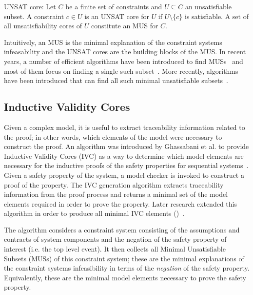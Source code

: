 \begin{definition} UNSAT core: Let $C$ be a finite set of constraints and $U \subseteq C$ an unsatisfiable subset. A constraint $c \in U$ is an UNSAT core for $U$ if $U \setminus \{c\}$ is satisfiable. A set of all unsatisfiability cores of $U$ constitute an MUS for $C$. 
\end{definition}

Intuitively, an MUS is the minimal explanation of the constraint systems infeasability and the UNSAT cores are the building blocks of the MUS. In recent years, a number of efficient algorithms have been introduced to find MUSs~\cite{liffiton2005max} and most of them focus on finding a single such subset~\cite{belov2012towards, belov2013core, belov2012muser2}. More recently, algorithms have been introduced that can find all such minimal unsatisfiable subsets~\cite{GhassabaniGW16, Ghassabani2017EfficientGO,bendik2018online}. 

\subsection{Inductive Validity Cores} Given a complex model, it is useful to extract traceability information related to the proof; in other words, which elements of the model were necessary to construct the proof. An algorithm was introduced by Ghassabani et al. to provide Inductive Validity Cores (IVC) as a way to determine which model elements are necessary for the inductive proofs of the safety properties for sequential systems~\cite{GhassabaniGW16}. Given a safety property of the system, a model checker is invoked to construct a proof of the property. The IVC generation algorithm extracts traceability information from the proof process and returns a minimal set of the model elements required in order to prove the property. Later research extended this algorithm in order to produce all minimal IVC elements (\aivcalg)~\cite{Ghassabani2017EfficientGO,bendik2018online}. 

The \aivcalg algorithm considers a constraint system consisting of the assumptions and contracts of system components and the negation of the safety property of interest (i.e. the top level event). It then collects all Minimal Unsatisfiable Subsets (MUSs) of this constraint system; these are the minimal explanations of the constraint systems infeasibility in terms of the \textit{negation} of the safety property. Equivalently, these are the minimal model elements necessary to prove the safety property. 

